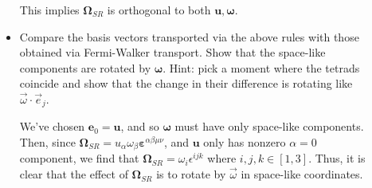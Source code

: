 \documentclass[12pt]{report}
\newcommand{\bm}[1]{\boldsymbol{\mathbf{#1}}}
\begin{document}
\begin{description}
\begin{itemize}
                This implies $\bm{\Omega}_{SR}$ is orthogonal to both
                $\bm{u}, \bm{\omega}$.

            \item Compare the basis vectors transported via the above rules with
                those obtained via Fermi-Walker transport. Show that the
                space-like components are rotated by $\bm{\omega}$. Hint:
                pick a moment where the tetrads coincide and show that the
                change in their difference is rotating like $\vec{\omega} \cdot
                \vec{e}_{j}$.

                We've chosen $\bm{e}_0 = \bm{u}$, and so $\bm{\omega}$ must have
                only space-like components. Then, since $\bm{\Omega}_{SR} =
                u_\alpha \omega_\beta \bm{\varepsilon}^{\alpha \beta \mu \nu}$,
                and $\bm{u}$ only has nonzero $\alpha = 0$ component, we find
                that $\bm{\Omega}_{SR} = \omega_i \epsilon^{ijk}$ where $i,j,k
                \in [1,3]$. Thus, it is clear that the effect of
                $\bm{\Omega}_{SR}$ is to rotate by $\vec{\omega}$ in space-like
                coordinates.
        \end{itemize}
\end{description}
\end{document}
